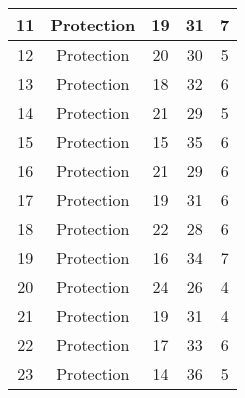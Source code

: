 \documentclass[results.tex]{subfiles}
\begin{document}
\begin{center}
\begin{tabular}{| c || c | c | c | c |}
            \hline
            11                      & Protection                   & 19                     & 31                      & 7                    \\
            \hline
            12                      & Protection                   & 20                     & 30                      & 5                    \\
            \hline
            13                      & Protection                   & 18                     & 32                      & 6                    \\
            \hline
            14                      & Protection                   & 21                     & 29                      & 5                    \\
            \hline
            15                      & Protection                   & 15                     & 35                      & 6                    \\
            \hline
            16                      & Protection                   & 21                     & 29                      & 6                    \\
            \hline
            17                      & Protection                   & 19                     & 31                      & 6                    \\
            \hline
            18                      & Protection                   & 22                     & 28                      & 6                    \\
            \hline
            19                      & Protection                   & 16                     & 34                      & 7                    \\
            \hline
            20                      & Protection                   & 24                     & 26                      & 4                    \\
            \hline
            21                      & Protection                   & 19                     & 31                      & 4                    \\
            \hline
            22                      & Protection                   & 17                     & 33                      & 6                    \\
            \hline
            23                      & Protection                   & 14                     & 36                      & 5                    \\

\end{tabular}
\end{center}
\end{document}
